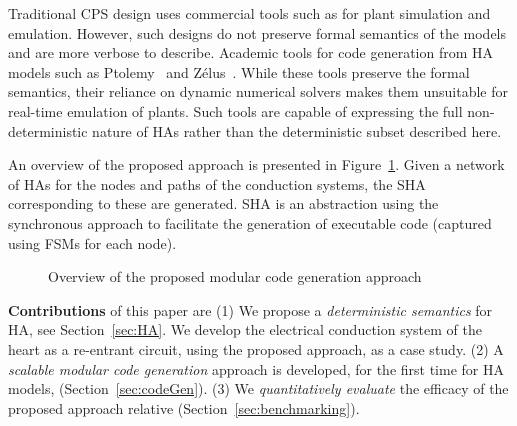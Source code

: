 {Traditional \ac{CPS} design uses commercial tools such as \simulink for plant simulation and emulation.
However, such designs do not preserve formal semantics of the models and are more verbose to describe.
Academic tools for code generation from \ac{HA} models such as Ptolemy~\cite{ptolemaeus2014system} and Z\'{e}lus~\cite{bourke13zelus}.
While these tools preserve the formal semantics, their reliance on dynamic numerical solvers makes them unsuitable for real-time emulation of plants.
Such tools are capable of expressing the full non-deterministic nature of \acp{HA} rather than the deterministic subset described here.}

   
 An overview of the proposed approach is presented
 in Figure~\ref{fig:overview}. Given a network
 of \acp{HA} for the nodes and paths of the conduction systems, the \ac{SHA} corresponding to these are generated. \ac{SHA} is an abstraction using the
synchronous approach to facilitate the generation of executable code (captured using \acp{FSM} for each node).
 
 \begin{figure}[bthp]
 	\centering
 	\scalebox{0.7}{
	 
	}
	 \caption{Overview of the proposed modular 
	 	code generation approach \label{fig:overview}}
\end{figure}
      
\textbf{Contributions} of this paper are 
(1) We propose a \emph{deterministic semantics} for \acf{HA}, see Section~\ref{sec:HA}.
We develop the electrical conduction system of the heart as a re-entrant circuit,
 using the proposed approach, as a case study.
(2) A \emph{scalable modular code generation} approach is developed, for the first time for \ac{HA} models, (Section~\ref{sec:codeGen}).
(3) We \emph{quantitatively evaluate} the efficacy of the 
proposed approach relative \simulink (Section~\ref{sec:benchmarking}).
 
